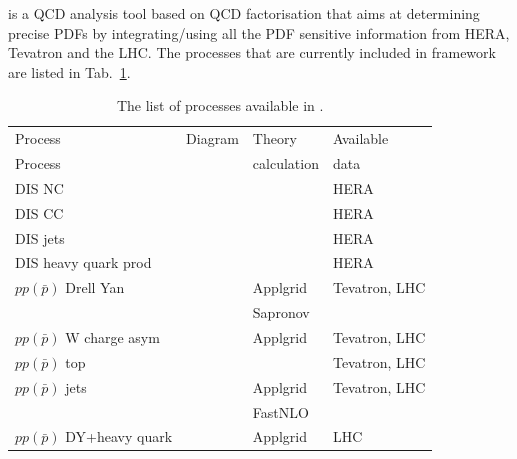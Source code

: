 \fitter is a QCD analysis tool based on QCD factorisation that aims at 
determining precise PDFs by integrating/using all the PDF sensitive information
from HERA, Tevatron and the LHC.
%
The processes that are currently included in \fitter framework are listed in Tab.~\ref{tab:proc}.
%
\begin{table}
\begin{tabular}{|l|l|l|l|}
\hline
Process &  Diagram & Theory      & Available \\
Process &          & calculation &  data\\
\hline
DIS NC   & & & HERA \\
DIS CC   & & & HERA \\
DIS jets & & & HERA\\
DIS heavy quark prod & & & HERA \\
\hline
$pp(\bar p)$ Drell Yan & & Applgrid & Tevatron, LHC \\
                       & & Sapronov  &  \\
$pp(\bar p)$ W charge asym & & Applgrid & Tevatron, LHC \\
$pp(\bar p)$ top & & & Tevatron, LHC \\
$pp(\bar p)$ jets & & Applgrid & Tevatron, LHC \\
                  & & FastNLO  &  \\
$pp(\bar p)$ DY+heavy quark & & Applgrid & LHC \\
\hline
\end{tabular}
\caption{The list of processes available in \fitter.}
\label{tab:proc}
\end{table}
%

